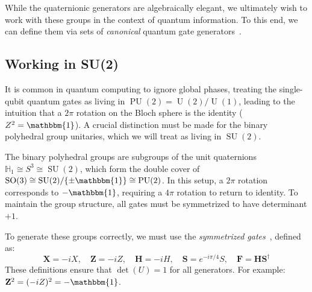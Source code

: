 \documentclass[11pt, oneside, openany]{scrbook}
\DeclareMathOperator{\SU}{SU}
\DeclareMathOperator{\SO}{SO}
\DeclareMathOperator{\U}{U}
\DeclareMathOperator{\PU}{PU}
\newcommand{\Id}{\mathbbm{1}}
\begin{document}
While the quaternionic generators are algebraically elegant, we ultimately wish to work with these groups in the context of quantum information. To this end, we can define them via sets of \textit{canonical} quantum gate generators~\cite{kubischta2023familyquantumcodes}.

\subsection{Working in SU(2)} \label{sec:workinginsu2}

It is common in quantum computing to ignore global phases, treating the single-qubit quantum gates as living in $\PU(2) = \U(2)/\U(1)$, leading to the intuition that a $2\pi$ rotation on the Bloch sphere is the identity ($Z^2 = \Id$). A crucial distinction must be made for the binary polyhedral group unitaries, which we will treat as living in $\SU(2)$.

The binary polyhedral groups are subgroups of the unit quaternions $\mathbb{H}_1 \cong S^3 \cong \SU(2)$, which form the double cover of $\SO(3) \cong \SU(2)/\{\pm\Id\} \cong \PU(2)$. In this setup, a $2\pi$ rotation corresponds to $-\Id$, requiring a $4\pi$ rotation to return to identity. To maintain the group structure, all gates must be symmetrized to have determinant $+1$.

To generate these groups correctly, we must use the \textit{symmetrized gates}~\cite{kubischta2023familyquantumcodes}, defined as:
\[
\mathbf{X} = -i X, \quad \mathbf{Z} = -i Z, \quad \mathbf{H} = -i H, \quad \mathbf{S} = e^{-i\pi/4} S, \quad \mathbf{F} = \mathbf{H}\mathbf{S}^\dagger
\]
These definitions ensure that $\det(U) = 1$ for all generators. For example: $\mathbf{Z}^2 = (-iZ)^2 = -\Id$.
\end{document}
